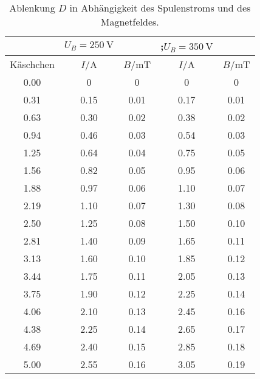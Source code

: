 \begin{table}[H]
  \centering
   \begin{tabular}{c| c c| c c}
    \toprule
    \:\:\:\:\:&  $U_B=\SI{250}{\V}$ & & ;$U_B=\SI{350}{\V}$& \\
    \toprule
    Käschchen & $I$/\;A & $B$/\;mT & $I$/\;A & $B$/\;mT\\
    \midrule
    0.00 & 0    & 0    &  0   & 0\\
    0.31 & 0.15 & 0.01 & 0.17 & 0.01\\
    0.63 & 0.30 & 0.02 & 0.38 & 0.02\\
    0.94 & 0.46 & 0.03 & 0.54 & 0.03\\
    1.25 & 0.64 & 0.04 & 0.75 & 0.05\\
    1.56 & 0.82 & 0.05 & 0.95 & 0.06\\
    1.88 & 0.97 & 0.06 & 1.10 & 0.07\\
    2.19 & 1.10 & 0.07 & 1.30 & 0.08\\
    2.50 & 1.25 & 0.08 & 1.50 & 0.10\\
    2.81 & 1.40 & 0.09 & 1.65 & 0.11\\
    3.13 & 1.60 & 0.10 & 1.85 & 0.12\\
    3.44 & 1.75 & 0.11 & 2.05 & 0.13\\
    3.75 & 1.90 & 0.12 & 2.25 & 0.14\\
    4.06 & 2.10 & 0.13 & 2.45 & 0.16\\
    4.38 & 2.25 & 0.14 & 2.65 & 0.17\\
    4.69 & 2.40 & 0.15 & 2.85 & 0.18\\
    5.00 & 2.55 & 0.16 & 3.05 & 0.19\\
    \bottomrule
  \end{tabular}
  \caption{Ablenkung $D$ in Abhängigkeit des Spulenstroms und des Magnetfeldes.}
  \label{tab:tab1}
\end{table}
